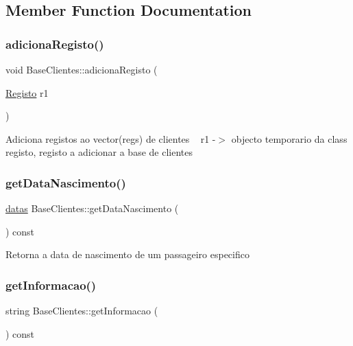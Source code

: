 \subsection{Member Function Documentation}
\mbox{\label{class_base_clientes_ad9f54e6c07cd4df57125dce94881b754}} 
\subsubsection{\texorpdfstring{adiciona\+Registo()}{adicionaRegisto()}}
{\footnotesize\ttfamily void Base\+Clientes\+::adiciona\+Registo (\begin{DoxyParamCaption}\item[{\mbox{\hyperlink{class_registo}{Registo}}}]{r1 }\end{DoxyParamCaption})}

Adiciona registos ao vector(regs) de clientes ~\newline
r1 -\/$>$ objecto temporario da class registo, registo a adicionar a base de clientes \mbox{\label{class_base_clientes_af5f1851e06f265c81ea5e8972dd3fc29}} 
\subsubsection{\texorpdfstring{get\+Data\+Nascimento()}{getDataNascimento()}}
{\footnotesize\ttfamily \mbox{\hyperlink{structdatas}{datas}} Base\+Clientes\+::get\+Data\+Nascimento (\begin{DoxyParamCaption}{ }\end{DoxyParamCaption}) const}

Retorna a data de nascimento de um passageiro especifico \mbox{\label{class_base_clientes_a26bfebe87514243d8f7d54296202ea83}} 
\subsubsection{\texorpdfstring{get\+Informacao()}{getInformacao()}}
{\footnotesize\ttfamily string Base\+Clientes\+::get\+Informacao (\begin{DoxyParamCaption}{ }\end{DoxyParamCaption}) const}

